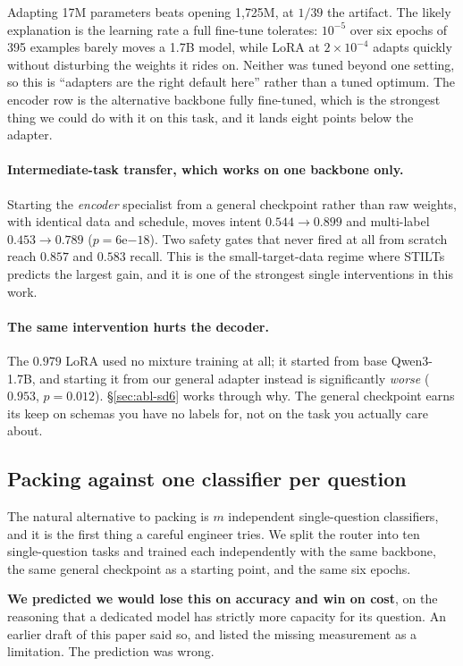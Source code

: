 Adapting 17M parameters beats opening 1{,}725M, at $1/39$ the artifact.
The likely explanation is the learning rate a full fine-tune tolerates:
$10^{-5}$ over six epochs of 395 examples barely moves a 1.7B model, while
LoRA at $2\times10^{-4}$ adapts quickly without disturbing the weights it
rides on. Neither was tuned beyond one setting, so this is ``adapters are
the right default here'' rather than a tuned optimum. The encoder row is
the alternative backbone fully fine-tuned, which is the strongest thing we
could do with it on this task, and it lands eight points below the
adapter.

\paragraph{Intermediate-task transfer, which works on one backbone only.}
Starting the \emph{encoder} specialist from a general checkpoint rather
than raw weights, with identical data and schedule, moves intent
$0.544 \to 0.899$ and multi-label $0.453 \to 0.789$
($p = 6\mathrm{e}{-18}$). Two safety gates that never fired at all from
scratch reach $0.857$ and $0.583$ recall. This is the small-target-data
regime where STILTs~\cite{stilts} predicts the largest gain, and it is one
of the strongest single interventions in this work.

\paragraph{The same intervention hurts the decoder.} The $0.979$ LoRA
used no mixture training at all; it started from base Qwen3-1.7B, and
starting it from our general adapter instead is significantly
\emph{worse} ($0.953$, $p = 0.012$). \S\ref{sec:abl-sd6} works through
why. The general checkpoint earns its keep on schemas you have no labels
for, not on the task you actually care about.

\subsection{Packing against one classifier per question}
\label{sec:res-separate}

The natural alternative to packing is $m$ independent single-question
classifiers, and it is the first thing a careful engineer tries. We split
the router into ten single-question tasks and trained each independently
with the same backbone, the same general checkpoint as a starting point,
and the same six epochs.

\textbf{We predicted we would lose this on accuracy and win on cost}, on
the reasoning that a dedicated model has strictly more capacity for its
question. An earlier draft of this paper said so, and listed the missing
measurement as a limitation. The prediction was wrong.


